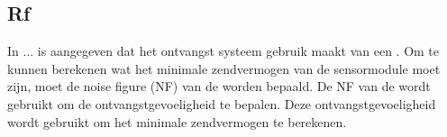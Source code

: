 \subsection{Rf} \label{sec:ontwerp:Rf}







In ... is aangegeven dat het ontvangst systeem gebruik maakt van een \mcu. Om te kunnen berekenen wat het minimale zendvermogen van de sensormodule moet zijn, moet de noise figure (NF) van de \mcu worden bepaald. De NF van de \mcu wordt gebruikt om de ontvangstgevoeligheid te bepalen. Deze ontvangstgevoeligheid wordt gebruikt om het minimale zendvermogen te berekenen.

